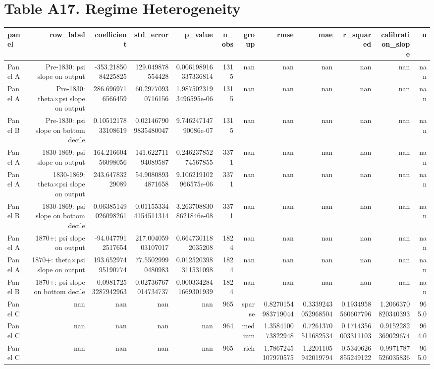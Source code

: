 \documentclass{article}
\begin{document}
\section*{Table A17. Regime Heterogeneity}
\begin{tabular}{lrrrrrrrrrrr}
\hline
panel & row_label & coefficient & std_error & p_value & n_obs & group & rmse & mae & r_squared & calibration_slope & n \\
\hline
Panel A & Pre-1830: psi slope on output & -353.2185084225825 & 129.049878554428 & 0.006198916337336814 & 1315 & nan & nan & nan & nan & nan & nan \\
Panel A & Pre-1830: theta×psi slope on output & 286.6969716566459 & 60.29770930716156 & 1.9875023193496595e-06 & 1315 & nan & nan & nan & nan & nan & nan \\
Panel B & Pre-1830: psi slope on bottom decile & 0.1051217833108619 & 0.021467909835480047 & 9.74624714790086e-07 & 1315 & nan & nan & nan & nan & nan & nan \\
Panel A & 1830-1869: psi slope on output & 164.21660456098056 & 141.62271194089587 & 0.24623785274567855 & 3371 & nan & nan & nan & nan & nan & nan \\
Panel A & 1830-1869: theta×psi slope on output & 243.64783229089 & 54.90808934871658 & 9.106219102966575e-06 & 3371 & nan & nan & nan & nan & nan & nan \\
Panel B & 1830-1869: psi slope on bottom decile & 0.06385149026098261 & 0.011553344154511314 & 3.2637088308621846e-08 & 3371 & nan & nan & nan & nan & nan & nan \\
Panel A & 1870+: psi slope on output & -94.0477912517654 & 217.00405903107017 & 0.6647301182035208 & 1824 & nan & nan & nan & nan & nan & nan \\
Panel A & 1870+: theta×psi slope on output & 193.65297495190774 & 77.55029990480983 & 0.012520398311531098 & 1824 & nan & nan & nan & nan & nan & nan \\
Panel B & 1870+: psi slope on bottom decile & -0.09817253287942963 & 0.02736767014734737 & 0.0003342841669301939 & 1824 & nan & nan & nan & nan & nan & nan \\
Panel C & nan & nan & nan & nan & 965 & sparse & 0.8270154983719044 & 0.3339243052968504 & 0.1934958560607796 & 1.2066370820340393 & 965.0 \\
Panel C & nan & nan & nan & nan & 964 & medium & 1.358410073822948 & 0.7261370511682534 & 0.1714356003311103 & 0.9152282369029674 & 964.0 \\
Panel C & nan & nan & nan & nan & 965 & rich & 1.7867245107970575 & 1.2201105942019794 & 0.5340626855249122 & 0.9971787526035836 & 965.0 \\
\hline
\end{tabular}
\end{document}
